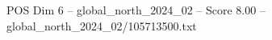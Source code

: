 \begin{textsample}{POS Dim 6 – global\_north\_2024\_02 – Score 8.00 – global\_north\_2024\_02/105713500.txt}
\end{textsample}

